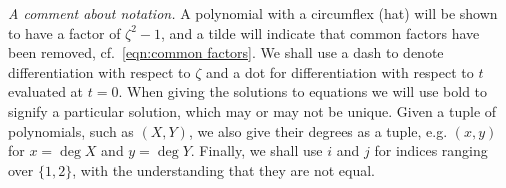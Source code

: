 \documentclass{article}
\begin{document}


\emph{A comment about notation.} 
A polynomial with a circumflex (hat) will be shown to have a factor of $\zeta^2-1$, and a tilde will indicate that common factors have been removed, cf.~\eqref{eqn:common factors}. 
We shall use a dash to denote differentiation with respect to $\zeta$ and a dot for differentiation with respect to $t$ evaluated at $t=0$.
When giving the solutions to equations we will use bold to signify a particular solution, which may or may not be unique.
Given a tuple of polynomials, such as $(X,Y)$, we also give their degrees as a tuple, e.g. $(x,y)$ for $x=\deg X$ and $y=\deg Y$. 
Finally, we shall use $i$ and $j$ for indices ranging over $\{1,2\}$, with the understanding that they are not equal. 
\end{document}
